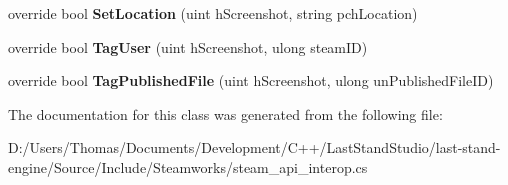 \begin{DoxyCompactItemize}
\item 
\hypertarget{classValve_1_1Steamworks_1_1CSteamScreenshots_a1d7506436b59133a010615dc33d6dd0c}{}override bool {\bfseries Set\+Location} (uint h\+Screenshot, string pch\+Location)\label{classValve_1_1Steamworks_1_1CSteamScreenshots_a1d7506436b59133a010615dc33d6dd0c}

\item 
\hypertarget{classValve_1_1Steamworks_1_1CSteamScreenshots_a424c5c68ffdf466f143fde81dc48f0d0}{}override bool {\bfseries Tag\+User} (uint h\+Screenshot, ulong steam\+I\+D)\label{classValve_1_1Steamworks_1_1CSteamScreenshots_a424c5c68ffdf466f143fde81dc48f0d0}

\item 
\hypertarget{classValve_1_1Steamworks_1_1CSteamScreenshots_a0edd9e62c0ddf8cc6c46d845fa3e8156}{}override bool {\bfseries Tag\+Published\+File} (uint h\+Screenshot, ulong un\+Published\+File\+I\+D)\label{classValve_1_1Steamworks_1_1CSteamScreenshots_a0edd9e62c0ddf8cc6c46d845fa3e8156}

\end{DoxyCompactItemize}


The documentation for this class was generated from the following file\+:\begin{DoxyCompactItemize}
\item 
D\+:/\+Users/\+Thomas/\+Documents/\+Development/\+C++/\+Last\+Stand\+Studio/last-\/stand-\/engine/\+Source/\+Include/\+Steamworks/steam\+\_\+api\+\_\+interop.\+cs\end{DoxyCompactItemize}
